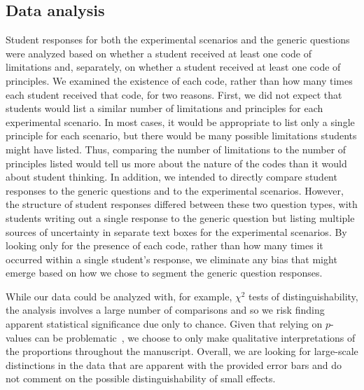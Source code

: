\documentclass[english,aps,prstper,reprint,showpacs,longbibliography,superscriptaddress,nofootinbib]{revtex4-2}
\begin{document}
\subsection{Data analysis}

Student responses for both the experimental scenarios and the generic questions were analyzed based on whether a student received at least one code of limitations and, separately, on whether a student received at least one code of principles. We examined the existence of each code, rather than how many times each student received that code, for two reasons. First, we did not expect that students would list a similar number of limitations and principles for each experimental scenario. In most cases, it would be appropriate to list only a single principle for each scenario, but there would be many possible limitations students might have listed. Thus, comparing the number of limitations to the number of principles listed would tell us more about the nature of the codes than it would about student thinking. In addition, we intended to directly compare student responses to the generic questions and to the experimental scenarios. However, the structure of student responses differed between these two question types, with students writing out a single response to the generic question but listing multiple sources of uncertainty in separate text boxes for the experimental scenarios. By looking only for the presence of each code, rather than how many times it occurred within a single student's response, we eliminate any bias that might emerge based on how we chose to segment the generic question responses.


While our data could be analyzed with, for example, $\chi^2$ tests of distinguishability, the analysis involves a large number of comparisons and so we risk finding apparent statistical significance due only to chance. Given that relying on $p$-values can be problematic~\cite[see, for example, ][]{cohen_earth_1994, cumming_new_2013, nosek_preregistration_2018}, we choose to only make qualitative interpretations of the proportions throughout the manuscript. Overall, we are looking for large-scale distinctions in the data that are apparent with the provided error bars and do not comment on the possible distinguishability of small effects.
\end{document}
